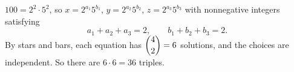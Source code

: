 $100=2^2\cdot5^2$, so $x=2^{a_1}5^{b_1}$, $y=2^{a_2}5^{b_2}$, $z=2^{a_3}5^{b_3}$ with nonnegative integers satisfying
\[a_1+a_2+a_3=2,\qquad b_1+b_2+b_3=2.\]
By stars and bars, each equation has $\dbinom{4}{2}=6$ solutions, and the choices are independent. So there are $6\cdot6=\boxed{36}$ triples.
